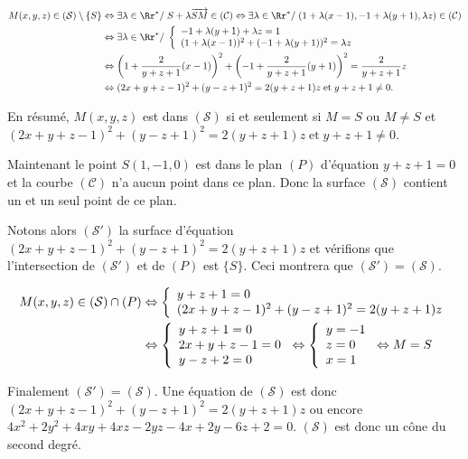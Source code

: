 {\begin{enumerate}
{\begin{align*}\ensuremath
M(x,y,z)\in(\mathcal{S})\setminus\{S\}&\Leftrightarrow\exists\lambda\in\Rr^*/\;S+\lambda\overrightarrow{SM}\in(\mathcal{C})\Leftrightarrow\exists\lambda\in\Rr^*/\;(1+\lambda(x-1),-1+\lambda(y+1),\lambda z)\in(\mathcal{C})\\
 &\Leftrightarrow \exists\lambda\in\Rr^*/\;\left\{
\begin{array}{l}
-1+\lambda(y+1)+\lambda z=1\\
(1+\lambda(x-1))^2+(-1+\lambda(y+1))^2=\lambda z
\end{array}
\right.\\
 &\Leftrightarrow\left(1+\frac{2}{y+z+1}(x-1)\right)^2+\left(-1+\frac{2}{y+z+1}(y+1)\right)^2=\frac{2}{y+z+1}z \\
 &\Leftrightarrow (2x+y+z-1)^2 + (y-z+1)^2 = 2(y+z+1)z\;\text{et}\;y+z+1\neq0.
\end{align*}

En résumé, $M(x,y,z)$ est dans $(\mathcal{S})$ si et seulement si $M=S$ ou $M\neq S$ et $(2x+y+z-1)^2 + (y-z+1)^2 = 2(y+z+1)z\;\text{et}\;y+z+1\neq0$.

Maintenant le point $S(1,-1,0)$ est dans le plan $(P)$ d'équation $y+z+1 = 0$ et la courbe $(\mathcal{C})$ n'a aucun point dans ce plan. Donc la surface $(\mathcal{S})$ contient un et un seul point de ce plan.

Notons alors $(\mathcal{S}')$ la surface d'équation $(2x+y+z-1)^2 + (y-z+1)^2 = 2(y+z+1)z$ et vérifions que l'intersection de $(\mathcal{S}')$ et de $(P)$ est $\{S\}$. Ceci montrera que $(\mathcal{S}')=(\mathcal{S})$.

\begin{align*}\ensuremath
M(x,y,z)\in(\mathcal{S})\cap(P)&\Leftrightarrow\left\{
\begin{array}{l}
y+z+1=0\\
(2x+y+z-1)^2 + (y-z+1)^2 = 2(y+z+1)z
\end{array}
\right.\\
 &\Leftrightarrow\left\{
\begin{array}{l}
y+z+1=0\\
2x+y+z-1=0\\
y-z+2=0
\end{array}
\right.\Leftrightarrow\left\{
\begin{array}{l}
y=-1\\
z=0\\
x=1
\end{array}
\right.\Leftrightarrow M=S
\end{align*}

Finalement $(\mathcal{S}')=(\mathcal{S})$. Une équation de $(\mathcal{S})$ est donc $(2x+y+z-1)^2 + (y-z+1)^2 = 2(y+z+1)z$ ou encore $4x^2+2y^2+4xy+4xz-2yz-4x+2y-6z+2= 0$. $(\mathcal{S})$ est donc un cône du second degré.}
\end{enumerate}
}
